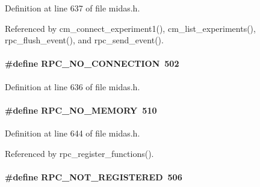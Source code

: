 \begin{DoxyItemize}
\item 
\end{DoxyItemize}

Definition at line 637 of file midas.h.

Referenced by cm\_\-connect\_\-experiment1(), cm\_\-list\_\-experiments(), rpc\_\-flush\_\-event(), and rpc\_\-send\_\-event().
\paragraph[{RPC\_\-NO\_\-CONNECTION}]{\setlength{\rightskip}{0pt plus 5cm}\#define RPC\_\-NO\_\-CONNECTION~502}\hfill\label{group__err25_gad3a9f2a6b26ce5b987f6b2088fbb627c}

\begin{DoxyItemize}
\item 
\end{DoxyItemize}

Definition at line 636 of file midas.h.
\paragraph[{RPC\_\-NO\_\-MEMORY}]{\setlength{\rightskip}{0pt plus 5cm}\#define RPC\_\-NO\_\-MEMORY~510}\hfill\label{group__err25_ga810bf4af4a5d29b1d1d1423e8889b35f}

\begin{DoxyItemize}
\item 
\end{DoxyItemize}

Definition at line 644 of file midas.h.

Referenced by rpc\_\-register\_\-functions().
\paragraph[{RPC\_\-NOT\_\-REGISTERED}]{\setlength{\rightskip}{0pt plus 5cm}\#define RPC\_\-NOT\_\-REGISTERED~506}\hfill\label{group__err25_ga8e46f3de256d0dc247efd6386b5b5a39}

\begin{DoxyItemize}
\item 
\end{DoxyItemize}

